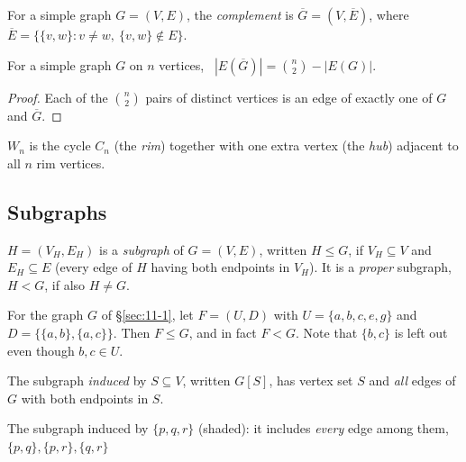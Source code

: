 \begin{definition}[Complement]
For a simple graph $G=(V,E)$, the \emph{complement} is $\overline G=(V,\overline E)$, where $\overline E=\{\{v,w\}: v\neq w,\ \{v,w\}\notin E\}$.
\end{definition}

\begin{proposition}
For a simple graph $G$ on $n$ vertices, \ $|E(\overline G)| = \binom n2 - |E(G)|$.
\end{proposition}
\begin{proof}
Each of the $\binom n2$ pairs of distinct vertices is an edge of exactly one of $G$ and $\overline G$.
\end{proof}

\begin{definition}
$W_n$ is the cycle $C_n$ (the \emph{rim}) together with one extra vertex (the \emph{hub}) adjacent to all $n$ rim vertices.
\end{definition}

\subsection{Subgraphs}
\label{sec:11-5}

\begin{definition}[Subgraph]\label{def:subgraph}
$H=(V_H,E_H)$ is a \emph{subgraph} of $G=(V,E)$, written $H\le G$, if $V_H\subseteq V$ and $E_H\subseteq E$ (every edge of $H$ having both endpoints in $V_H$). It is a \emph{proper} subgraph, $H<G$, if also $H\ne G$.
\end{definition}

\begin{example}
For the graph $G$ of \S\ref{sec:11-1}, let $F=(U,D)$ with $U=\{a,b,c,e,g\}$ and $D=\{\{a,b\},\{a,c\}\}$. Then $F\le G$, and in fact $F<G$. Note that $\{b,c\}$ is left out even though $b,c\in U$.
\end{example}

\begin{definition}\label{def:induced-subgraph}
The subgraph \emph{induced} by $S\subseteq V$, written $G[S]$, has vertex set $S$ and \emph{all} edges of $G$ with both endpoints in $S$.
\end{definition}

\begin{center}
\end{center}
\begin{center}
\small The subgraph induced by $\{p,q,r\}$ (shaded): it includes \emph{every} edge among them, $\{p,q\},\{p,r\},\{q,r\}$
\end{center}

